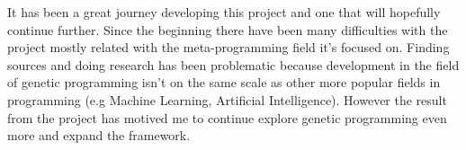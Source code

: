 It has been a great journey developing this project and one that will hopefully continue further. Since the
beginning there have been many difficulties with the project mostly related with the meta-programming field
it's focused on. Finding sources and doing research has been problematic because development in the field  of genetic programming 
isn't on the same scale as other more popular fields in programming (e.g Machine Learning, Artificial Intelligence).
However the result from the project has motived me to continue explore genetic programming even more and expand the
framework.